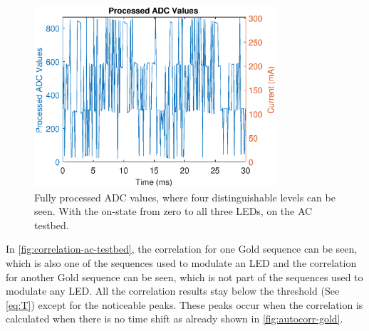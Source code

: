 \begin{figure}
  \centering
  \includegraphics[width=0.8\textwidth]{chapters/evaluation-chapters/hardware/ac/processed-ac-testbed-adc-data.eps}
    \caption{Fully processed ADC values, where four distinguishable levels can be seen. With the on-state from zero to all three LEDs, on the AC testbed.}
  \label{fig:processed-ac-testbed-adc-data}
\end{figure}





In \autoref{fig:correlation-ac-testbed}, the correlation for one Gold sequence can be seen, which is also one of the sequences used to modulate an LED and the correlation for another Gold sequence can be seen, which is not part of the sequences used to modulate any LED.
All the correlation results stay below the threshold (See \autoref{eq:T}) except for the noticeable peaks.
These peaks occur when the correlation is calculated when there is no time shift as already shown in \autoref{fig:autocorr-gold}.

